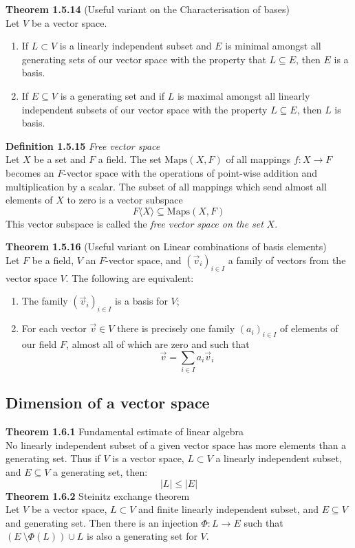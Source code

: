 \documentclass[8pt,landscape]{article}
\begin{document}
\begin{multicols}{3}
    \textbf{Theorem 1.5.14} (Useful variant on the Characterisation of bases) \\
    Let $V$ be a vector space.
    \begin{enumerate}
        \item If $L \subset V$ is a linearly independent subset and $E$ is minimal
            amongst all generating sets of our vector space with the property that
            $L \subseteq E$, then $E$ is a basis.
        \item If $E \subseteq V$ is a generating set and if $L$ is maximal amongst all
            linearly independent subsets of our vector space with the property
            $L \subseteq E$, then $L$ is  basis.
    \end{enumerate}

    \textbf{Definition 1.5.15} \emph{Free vector space} \\
    Let $X$ be a set and $F$ a field.
    The set $\text{Maps}(X,F)$ of all mappings $f : X \to F$ becomes an $F$-vector space
    with the operations of point-wise addition and multiplication by a scalar.
    The subset of all mappings which send almost all elements of
    $X$ to zero is a vector subspace
    \[
        F \langle X \rangle \subseteq \text{Maps}(X,F)
    \]
    This vector subspace is called the \emph{free vector space on the set} $X$.

    \textbf{Theorem 1.5.16} (Useful variant on Linear combinations of basis elements) \\
    Let $F$ be a field, $V$ an $F$-vector space, and ${(\vec{v}_i)}_{i\in I}$
    a family of vectors from the vector space $V$.
    The following are equivalent:
    \begin{enumerate}
        \item The family ${(\vec{v}_i)}_{i\in I}$ is a basis for $V$;
        \item For each vector $\vec{v} \in V$ there is precisely one family
            ${(a_i)}_{i \in I}$ of elements of our field $F$,
            almost all of which are zero and such that
            \[
                \vec{v} = \sum_{i \in I} a_i \vec{v}_i
            \]
    \end{enumerate}

    \subsection{Dimension of a vector space}

    \textbf{Theorem 1.6.1} Fundamental estimate of linear algebra \\
    No linearly independent subset of a given vector space has more elements than a
    generating set.
    Thus if $V$ is a vector space, $L \subset V$ a linearly independent subset,
    and $E \subseteq V$ a generating set, then:
    \[
        |L| \leq |E|
    \]
    \textbf{Theorem 1.6.2} Steinitz exchange theorem \\
    Let $V$ be a vector space, $L \subset V$ and finite linearly independent subset,
    and $E \subseteq V$ and generating set.
    Then there is an injection $\Phi : L \to E$ such that
    $(E \ \setminus \Phi(L)) \cup L$ is also a generating set for $V$.


\end{multicols}
\end{document}
